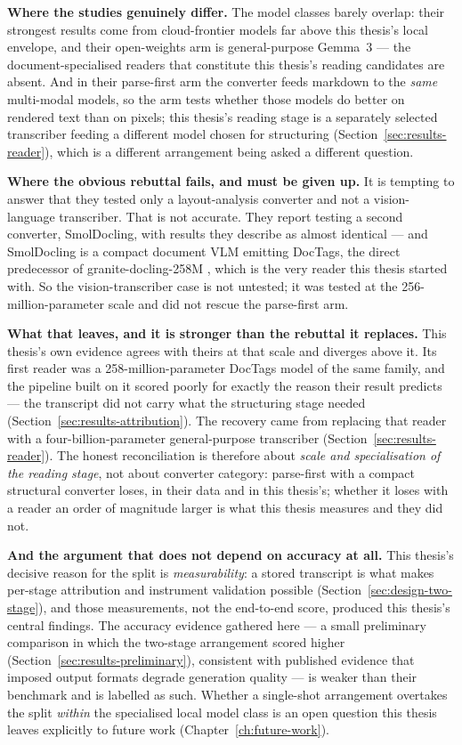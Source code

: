 \textbf{Where the studies genuinely differ.} The model classes barely overlap: their
strongest results come from cloud-frontier models far above this thesis's local envelope,
and their open-weights arm is general-purpose Gemma~3 --- the document-specialised readers
that constitute this thesis's reading candidates are absent. And in their parse-first arm
the converter feeds markdown to the \emph{same} multi-modal models, so the arm tests
whether those models do better on rendered text than on pixels; this thesis's reading stage
is a separately selected transcriber feeding a different model chosen for structuring
(Section~\ref{sec:results-reader}), which is a different arrangement being asked a different
question.

\textbf{Where the obvious rebuttal fails, and must be given up.} It is tempting to answer
that they tested only a layout-analysis converter and not a vision-language transcriber.
That is not accurate. They report testing a second converter, SmolDocling, with results
they describe as almost identical --- and SmolDocling is a compact document \ac{VLM}
emitting DocTags, the direct predecessor of granite-docling-258M
\parencite{granitedocling}, which is the very reader this thesis started with. So the
vision-transcriber case is not untested; it was tested at the 256-million-parameter scale
and did not rescue the parse-first arm.

\textbf{What that leaves, and it is stronger than the rebuttal it replaces.} This thesis's
own evidence agrees with theirs at that scale and diverges above it. Its first reader was a
258-million-parameter DocTags model of the same family, and the pipeline built on it scored
poorly for exactly the reason their result predicts --- the transcript did not carry what the
structuring stage needed (Section~\ref{sec:results-attribution}). The recovery came from
replacing that reader with a four-billion-parameter general-purpose transcriber
(Section~\ref{sec:results-reader}). The honest reconciliation is therefore about \emph{scale and
specialisation of the reading stage}, not about converter category: parse-first with a
compact structural converter loses, in their data and in this thesis's; whether it loses
with a reader an order of magnitude larger is what this thesis measures and they did not.

\textbf{And the argument that does not depend on accuracy at all.} This thesis's decisive
reason for the split is \emph{measurability}: a stored transcript is what makes per-stage
attribution and instrument validation possible (Section~\ref{sec:design-two-stage}), and those
measurements, not the end-to-end score, produced this thesis's central findings. The
accuracy evidence gathered here --- a small preliminary comparison in which the two-stage
arrangement scored higher (Section~\ref{sec:results-preliminary}), consistent with published evidence that
imposed output formats degrade generation quality \parencite{tam2024format} --- is weaker than
their benchmark and is labelled as such. Whether a single-shot arrangement overtakes the
split \emph{within} the specialised local model class is an open question this thesis
leaves explicitly to future work (Chapter~\ref{ch:future-work}).

